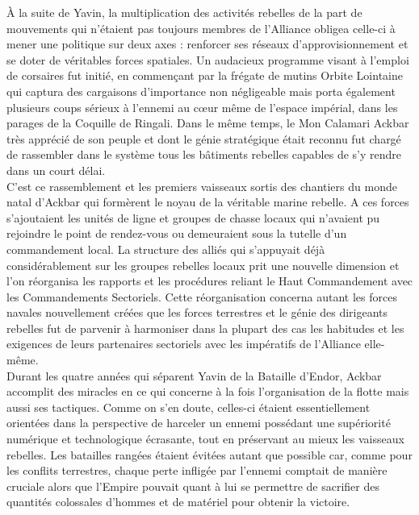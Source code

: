 \documentclass[twoside]{article}
\begin{document}
À la suite de Yavin, la multiplication des activités rebelles de la part de mouvements qui n'étaient pas toujours membres de l'Alliance obligea celle-ci à mener une politique sur deux axes : renforcer ses réseaux d'approvisionnement et se doter de véritables forces spatiales. Un audacieux programme visant à l'emploi de corsaires fut initié, en commençant par la frégate de mutins Orbite Lointaine qui captura des cargaisons d'importance non négligeable mais porta également plusieurs coups sérieux à l'ennemi au cœur même de l'espace impérial, dans les parages de la Coquille de Ringali. Dans le même temps, le Mon Calamari Ackbar très apprécié de son peuple et dont le génie stratégique était reconnu fut chargé de rassembler dans le système tous les bâtiments rebelles capables de s'y rendre dans un court délai. \\
C'est ce rassemblement et les premiers vaisseaux sortis des chantiers du monde natal d'Ackbar qui formèrent le noyau de la véritable marine rebelle. A ces forces s'ajoutaient les unités de ligne et groupes de chasse locaux qui n'avaient pu rejoindre le point de rendez-vous ou demeuraient sous la tutelle d'un commandement local. La structure des alliés  qui s'appuyait déjà considérablement sur les groupes rebelles locaux prit une nouvelle dimension et l'on réorganisa les rapports et les procédures reliant le Haut Commandement avec les Commandements Sectoriels. Cette réorganisation concerna autant les forces navales nouvellement créées que les forces terrestres et le génie des dirigeants rebelles fut de parvenir à harmoniser dans la plupart des cas les habitudes et les exigences de leurs partenaires sectoriels avec les impératifs de l'Alliance elle-même.\\

Durant les quatre années qui séparent Yavin de la Bataille d'Endor, Ackbar accomplit des miracles en ce qui concerne à la fois l'organisation de la flotte mais aussi ses tactiques. Comme on s'en doute, celles-ci étaient essentiellement orientées dans la perspective de harceler un ennemi possédant une supériorité numérique et technologique écrasante, tout en préservant au mieux les vaisseaux rebelles. Les batailles rangées étaient évitées autant que possible car, comme pour les conflits terrestres, chaque perte infligée par l'ennemi comptait de manière cruciale alors que l'Empire pouvait quant à lui se permettre de sacrifier des quantités colossales d'hommes et de matériel pour obtenir la victoire.\\
\end{document}
